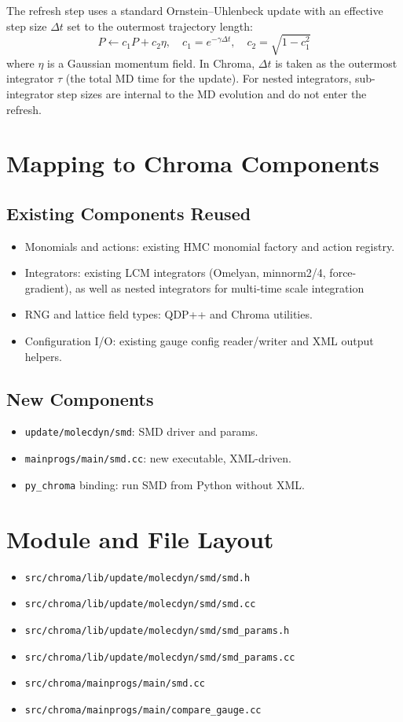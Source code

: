 \documentclass[11pt]{article}
\begin{document}
The refresh step uses a standard Ornstein--Uhlenbeck update with an effective
step size \(\Delta t\) set to the outermost trajectory length:
\begin{equation}
  P \leftarrow c_1 P + c_2 \eta, \quad c_1 = e^{-\gamma\Delta t},\quad c_2 = \sqrt{1-c_1^2}
\end{equation}
where \(\eta\) is a Gaussian momentum field.
In Chroma, \(\Delta t\) is taken as the outermost integrator \(\tau\) (the total
MD time for the update). For nested integrators, sub-integrator step sizes are
internal to the MD evolution and do not enter the refresh.

\section{Mapping to Chroma Components}
\subsection{Existing Components Reused}
\begin{itemize}[leftmargin=*]
  \item Monomials and actions: existing HMC monomial factory and action registry.
  \item Integrators: existing LCM integrators (Omelyan, minnorm2/4, force-gradient), as well as nested integrators for multi-time scale integration
  \item RNG and lattice field types: QDP++ and Chroma utilities.
  \item Configuration I/O: existing gauge config reader/writer and XML output helpers.
\end{itemize}


\subsection{New Components}
\begin{itemize}[leftmargin=*]
  \item \texttt{update/molecdyn/smd}: SMD driver and params.
  \item \texttt{mainprogs/main/smd.cc}: new executable, XML-driven.
  \item \texttt{py\_chroma} binding: run SMD from Python without XML.
\end{itemize}

\section{Module and File Layout}
\begin{itemize}[leftmargin=*]
  \item \texttt{src/chroma/lib/update/molecdyn/smd/smd.h}
  \item \texttt{src/chroma/lib/update/molecdyn/smd/smd.cc}
  \item \texttt{src/chroma/lib/update/molecdyn/smd/smd\_params.h}
  \item \texttt{src/chroma/lib/update/molecdyn/smd/smd\_params.cc}
  \item \texttt{src/chroma/mainprogs/main/smd.cc}
  \item \texttt{src/chroma/mainprogs/main/compare\_gauge.cc}
\end{itemize}
\end{document}
